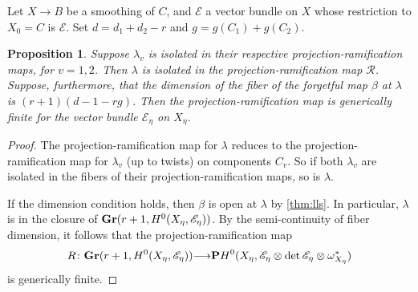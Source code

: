 \documentclass[11pt,reqno]{amsart}
\theoremstyle{plain}
\newtheorem{proposition}[theorem]{Proposition}
\theoremstyle{definition}
\theoremstyle{remark}
\numberwithin{equation}{section}
\renewcommand{\to}{{\longrightarrow}}
\numberwithin{equation}{section}
\begin{document}
Let $X \to B$ be a smoothing of $C$, and $\mathscr{E}$ a vector bundle on $X$ whose restriction to $X_0 = C$ is $\mathcal E$.
Set $d = d_1 + d_2 - r$ and $g = g(C_1) + g(C_2)$.
\begin{proposition}\label{prop:attachtail}
  Suppose $\lambda_v$ is isolated in their respective projection-ramification maps, for $v = 1,2$.
  Then $\lambda$ is isolated in the projection-ramification map $\mathcal R$.
  Suppose, furthermore, that the dimension of the fiber of the forgetful map $\beta$ at $\lambda$ is $(r+1)(d-1-rg)$.
  Then the projection-ramification map is generically finite for the vector bundle $\mathscr E_\eta$ on $X_\eta$.
\end{proposition}
\begin{proof}
  The projection-ramification map for $\lambda$ reduces to the projection-ramification map for $\lambda_v$ (up to twists) on components $C_v$.
  So if both $\lambda_v$ are isolated in the fibers of their projection-ramification maps, so is $\lambda$.

  If the dimension condition holds, then $\beta$ is open at $\lambda$ by \autoref{thm:lls}.
  In particular, $\lambda$ is in the closure of ${\bf Gr}(r+1, H^0(X_\eta, \mathscr E_\eta))$.
  By the semi-continuity of fiber dimension, it follows that the projection-ramification map 
  \[ R \from \Gr(r+1, H^0(X_\eta, \mathscr E_\eta)) \to \P H^0(X_\eta, \mathscr E_\eta \otimes \det \mathscr E_\eta \otimes \omega_{X_\eta}^*)\]
  is generically finite.
\end{proof}
\end{document}
